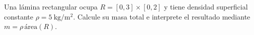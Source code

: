 Una lámina rectangular ocupa $R=[0,3]\times[0,2]$ y tiene densidad superficial constante $\rho=5\ \mathrm{kg/m^2}$. Calcule su masa total e interprete el resultado mediante $m=\rho\,\text{área}(R)$.

